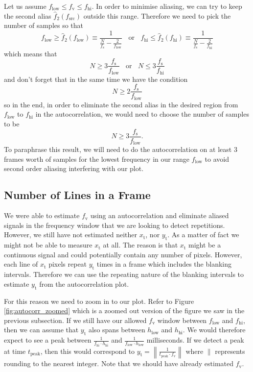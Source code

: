 \documentclass[a4paper,12pt,twoside,openright]{report}
\begin{document}
Let us assume $f_\text{low} \leq f_\text{v} \leq f_\text{hi}$. In order to minimise aliasing, we can try to keep the second alias $\hat{f}_{2}(f_\text{src})$ outside this range. Therefore we need to pick the number of samples so that
$$f_\text{low} \geq \hat{f}_{2}(f_\text{low}) \equiv \frac{1}{\frac{N}{f_\text{s}}-\frac{2}{f_\text{low}}}  \,\,\,\,\ \text{or} \,\,\,\,\ f_\text{hi} \leq \hat{f}_{2}(f_\text{hi}) \equiv \frac{1}{\frac{N}{f_\text{s}}-\frac{2}{f_\text{hi}}}  $$
which means that
$$ N \geq 3 \frac{f_\text{s}}{f_\text{low}} \,\,\,\,\ \text{or} \,\,\,\,\ N \leq 3 \frac{f_\text{s}}{f_\text{hi}} $$
and don't forget that in the same time we have the condition
$$N \geq 2 \frac{f_\text{s}}{f_\text{low}}$$
so in the end, in order to eliminate the second alias in the desired region from $f_\text{low}$ to $f_\text{hi}$ in the autocorrelation, we would need to choose the number of samples to be
\begin{equation}
\label{eq:autocorraliasingcondition}
N \geq 3 \frac{f_\text{s}}{f_\text{low}} .
\end{equation}
To paraphrase this result, we will need to do the autocorrelation on at least 3 frames worth of samples for the lowest frequency in our range $f_\text{low}$ to avoid second order aliasing interfering with our plot.

\subsection{Number of Lines in a Frame}

We were able to estimate $f_\text{v}$ using an autocorrelation and eliminate aliased signals in the frequency window that we are looking to detect repetitions. However, we still have not estimated neither $x_\text{t}$, nor $y_\text{t}$. As a matter of fact we might not be able to measure $x_\text{t}$ at all. The reason is that $x_\text{t}$ might be a continuous signal and could potentially contain any number of pixels. However, each line of $x_\text{t}$ pixels repeat $y_\text{t}$ times in a frame which includes the blanking intervals. Therefore we can use the repeating nature of the blanking intervals to estimate $y_\text{t}$ from the autocorrelation plot.

For this reason we need to zoom in to our plot. Refer to Figure \ref{fig:autocorr_zoomed} which is a zoomed out version of the figure we saw in the previous subsection. If we still have our allowed $f_\text{v}$ window between $f_\text{low}$ and $f_\text{hi}$, then we can assume that $y_\text{t}$ also spans between $h_\text{low}$ and $h_\text{hi}$. We would therefore expect to see a peak between $\frac{1}{f_\text{hi} \cdot h_\text{hi}}$ and $\frac{1}{f_\text{low} \cdot h_\text{low}}$ milliseconds. If we detect a peak at time $t_\text{peak}$, then this would correspond to $y_\text{t} = \left\| \frac{1}{t_\text{peak} \cdot f_\text{v}} \right\|$ where $\|$ represents rounding to the nearest integer. Note that we should have already estimated $f_\text{v}$.
\end{document}
